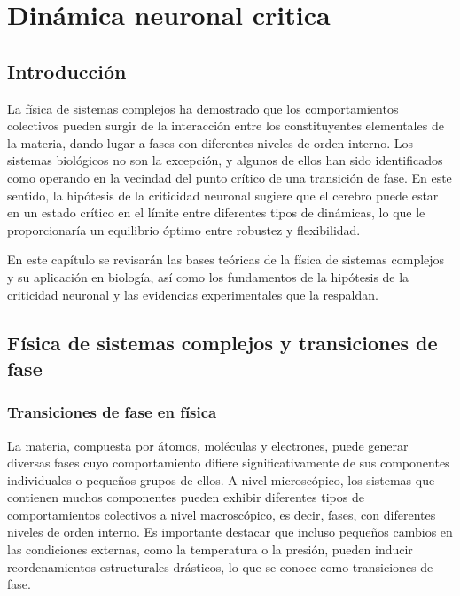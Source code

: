 \chapter{Dinámica neuronal critica}\label{titulo-cap-critico}
\graphicspath{{figs/capitulo_critico/}}



\section{Introducción}

La física de sistemas complejos ha demostrado que los comportamientos colectivos pueden surgir de la interacción entre los constituyentes elementales de la materia, dando lugar a fases con diferentes niveles de orden interno. Los sistemas biológicos no son la excepción, y algunos de ellos han sido identificados como operando en la vecindad del punto crítico de una transición de fase. En este sentido, la hipótesis de la criticidad neuronal sugiere que el cerebro puede estar en un estado crítico en el límite entre diferentes tipos de dinámicas, lo que le proporcionaría un equilibrio óptimo entre robustez y flexibilidad.

En este capítulo se revisarán las bases teóricas de la física de sistemas complejos y su aplicación en biología, así como los fundamentos de la hipótesis de la criticidad neuronal y las evidencias experimentales que la respaldan.





\section{Física de sistemas complejos y transiciones de fase}

\subsection{Transiciones de fase en física}

La materia, compuesta por átomos, moléculas y electrones, puede generar diversas fases cuyo comportamiento difiere significativamente de sus componentes individuales o pequeños grupos de ellos. A nivel microscópico, los sistemas que contienen muchos componentes pueden exhibir diferentes tipos de comportamientos colectivos a nivel macroscópico, es decir, fases, con diferentes niveles de orden interno. Es importante destacar que incluso pequeños cambios en las condiciones externas, como la temperatura o la presión, pueden inducir reordenamientos estructurales drásticos, lo que se conoce como transiciones de fase.

